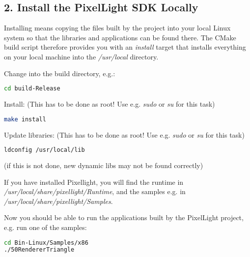 \subsection{2. Install the PixelLight \ac{SDK} Locally}
Installing means copying the files built by the project into your local Linux system so that the libraries and applications can be found there. The CMake build script therefore provides you with an \emph{install} target that installs everything on your local machine into the \emph{/usr/local} directory.

Change into the build directory, e.g.:
\begin{lstlisting}[language=sh]
cd build-Release
\end{lstlisting}

Install: (This has to be done as root! Use e.g. \emph{sudo} or \emph{su} for this task)
\begin{lstlisting}[language=sh]
make install
\end{lstlisting}

Update libraries: (This has to be done as root! Use e.g. \emph{sudo} or \emph{su} for this task)
\begin{lstlisting}[language=sh]
ldconfig /usr/local/lib
\end{lstlisting}
(if this is not done, new dynamic libs may not be found correctly)

If you have installed Pixellight, you will find the runtime in \emph{/usr/local/share/pixellight/Runtime}, and the samples e.g. in \emph{/usr/local/share/pixellight/Samples}.

Now you should be able to run the applications built by the PixelLight project, e.g. run one of the samples:
\begin{lstlisting}[language=sh]
cd Bin-Linux/Samples/x86
./50RendererTriangle
\end{lstlisting}
